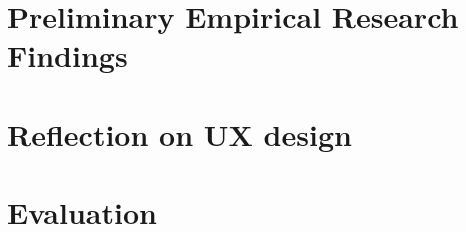 
\section{Preliminary Empirical Research Findings}
\section{Reflection on UX design}
\section{Evaluation}